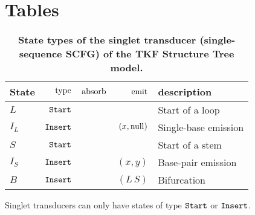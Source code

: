 \documentclass[10pt]{article}
\begin{document}
\clearpage
\section*{Tables}

\begin{table}[!ht]
  \caption{
    \textbf{State types of the singlet transducer (single-sequence
      SCFG) of the TKF Structure Tree model.}}
  \begin{tabular}{|l|rrrl|}
    \hline
    State & $\operatorname{type}$ & $\operatorname{absorb}$ & $\operatorname{emit}$ & description \\ \hline
    $L$ & $\mathtt{Start}$ & & & Start of a loop \\ \hline
    $I_L$ & $\mathtt{Insert}$ & & $(x,\mathrm{null})$ & Single-base emission \\ \hline \hline
    $S$ & $\mathtt{Start}$ & & & Start of a stem \\ \hline
    $I_S$ & $\mathtt{Insert}$ & & $(x,y)$ & Base-pair emission \\ \hline \hline
    $B$ & $\mathtt{Insert}$ & & $(L\,S)$ & Bifurcation \\ \hline
  \end{tabular}
  \begin{flushleft}
    Singlet transducers can only have states of type $\mathtt{Start}$ or
    $\mathtt{Insert}$.
  \end{flushleft}
\end{table}
\end{document}

